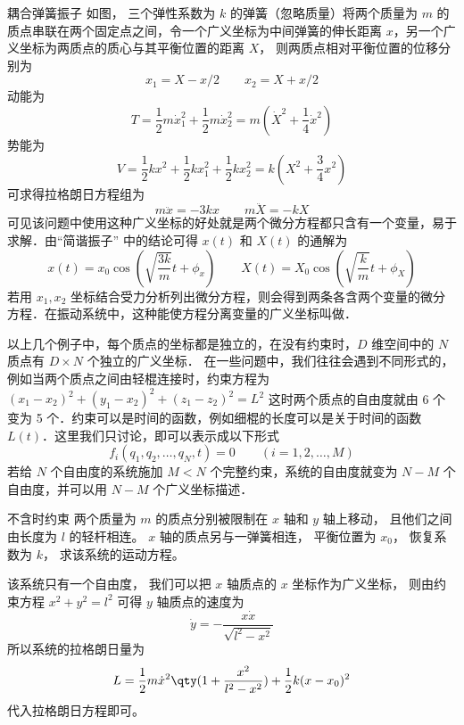 \begin{exam}{耦合弹簧振子}
如图，%
三个弹性系数为 $k$ 的弹簧（忽略质量）将两个质量为 $m$ 的质点串联在两个固定点之间，令一个广义坐标为中间弹簧的伸长距离 $x$，另一个广义坐标为两质点的质心与其平衡位置的距离 $X$， 则两质点相对平衡位置的位移分别为
\begin{equation}
x_1=X-x/2 \qquad x_2 = X+x/2
\end{equation}
动能为
\begin{equation}
T=\frac12 m\dot x_1^2 + \frac12 m\dot x_2^2 = m (\dot X^2 + \frac14 \dot x^2)
\end{equation}
势能为
\begin{equation}
V = \frac12 k x^2 + \frac12 kx_1^2 + \frac12 k x_2^2 = k(X^2 + \frac34 x^2)
\end{equation}
可求得拉格朗日方程组为
\begin{equation}
m\ddot x =  - 3kx \qquad m\ddot X =  - kX
\end{equation}
可见该问题中使用这种广义坐标的好处就是两个微分方程都只含有一个变量，易于求解．由“简谐振子” 中的结论可得 $x(t)$ 和 $X(t)$ 的通解为
\begin{equation}
x(t) = x_0 \cos(\sqrt{\frac{3k}{m}} t + \phi_x)
\qquad
X(t) = X_0 \cos(\sqrt{\frac{k}{m}} t + \phi_X)
\end{equation}
若用 $x_1, x_2$ 坐标结合受力分析列出微分方程，则会得到两条各含两个变量的微分方程．在振动系统中，这种能使方程分离变量的广义坐标叫做．%
\end{exam}
\phantom{=}

以上几个例子中，每个质点的坐标都是独立的，在没有约束时，$D$ 维空间中的 $N$ 质点有 $D\times N$ 个独立的广义坐标． 在一些问题中，我们往往会遇到不同形式的，例如当两个质点之间由轻棍连接时，约束方程为 $(x_1-x_2)^2+(y_1-x_2)^2+(z_1-z_2)^2=L^2$ 这时两个质点的自由度就由 6 个变为 5 个．约束可以是时间的函数，例如细棍的长度可以是关于时间的函数 $L(t)$．这里我们只讨论，即可以表示成以下形式
\begin{equation}
f_i(q_1,q_2,\dots ,q_N,t) = 0 \qquad (i = 1,2,\dots,M)
\end{equation}
若给 $N$ 个自由度的系统施加 $M<N$ 个完整约束，系统的自由度就变为 $N-M$ 个自由度，并可以用 $N-M$ 个广义坐标描述．

\begin{exam}{不含时约束}
两个质量为 $m$ 的质点分别被限制在 $x$ 轴和 $y$ 轴上移动， 且他们之间由长度为 $l$ 的轻杆相连。 $x$ 轴的质点另与一弹簧相连， 平衡位置为 $x_0$， 恢复系数为 $k$， 求该系统的运动方程。

该系统只有一个自由度， 我们可以把 $x$ 轴质点的 $x$ 坐标作为广义坐标， 则由约束方程 $x^2 + y^2 = l^2$ 可得 $y$ 轴质点的速度为
\begin{equation}
\dot y = -\frac{x\dot x}{\sqrt{l^2 - x^2}}
\end{equation}
所以系统的拉格朗日量为
\begin{equation}
L = \frac12 m \dot x^2\qty(1 + \frac{x^2}{l^2 - x^2}) + \frac12 k (x-x_0)^2
\end{equation}
代入拉格朗日方程即可。
\end{exam}

